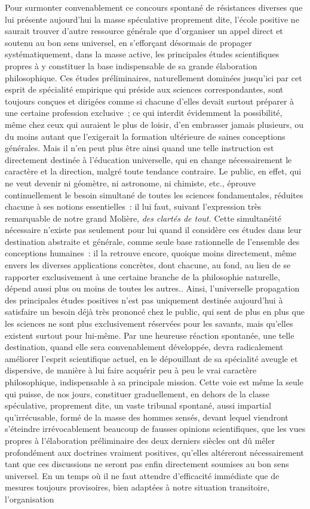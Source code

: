 \documentclass[french,twoside]{book} %
\begin{document}
Pour surmonter convenablement ce concours spontané de résistances diverses que lui présente aujourd’hui la masse spéculative proprement dite, l’école positive ne saurait trouver d’autre ressource générale que d’organiser un appel direct et soutenu au bon sens universel, en s’efforçant désormais de propager systématiquement, dans la masse active, les principales études scientifiques propres à y constituer la base indispensable de sa grande élaboration philosophique. Ces études préliminaires, naturellement dominées jusqu’ici par cet esprit de spécialité empirique qui préside aux sciences correspondantes, sont toujours conçues et dirigées comme si chacune d’elles devait surtout préparer à une certaine profession exclusive ; ce qui interdit évidemment la possibilité, même chez ceux qui auraient le plus de loisir, d’en embrasser jamais plusieurs, ou du moins autant que l’exigerait la formation ultérieure de saines conceptions générales. Mais il n’en peut plus être ainsi quand une telle instruction est directement destinée à l’éducation universelle, qui en change nécessairement le caractère et la direction, malgré toute tendance contraire. Le public, en effet, qui ne veut devenir ni géomètre, ni astronome, ni chimiste, etc., éprouve continuellement le besoin simultané de toutes les sciences fondamentales, réduites chacune à ses notions essentielles : il lui faut, suivant l’expression très remarquable de notre grand Molière, {\itshape des clartés de tout.} Cette simultanéité nécessaire n’existe pas seulement pour lui quand il considère ces études dans leur destination abstraite et générale, comme seule base rationnelle de l’ensemble des conceptions humaines : il la retrouve encore, quoique moins directement, même envers les diverses applications concrètes, dont chacune, au fond, au lieu de se rapporter exclusivement à une certaine branche de la philosophie naturelle, dépend aussi plus ou moins de toutes les autres.. Ainsi, l’universelle propagation des principales études positives n’est pas uniquement destinée aujourd’hui à satisfaire un besoin déjà très prononcé chez le public, qui sent de plus en plus que les sciences ne sont plus exclusivement réservées pour les savants, mais qu’elles existent surtout pour lui-même. Par une heureuse réaction spontanée, une telle destination, quand elle sera convenablement développée, devra radicalement améliorer l’esprit scientifique actuel, en le dépouillant de sa spécialité aveugle et dispersive, de manière à lui faire acquérir peu à peu le vrai caractère philosophique, indispensable à sa principale mission. Cette voie est même la seule qui puisse, de nos jours, constituer graduellement, en dehors de la classe spéculative, proprement dite, un vaste tribunal spontané, aussi impartial qu’irrécusable, formé de la masse des hommes sensés, devant lequel viendront s’éteindre irrévocablement beaucoup de fausses opinions scientifiques, que les vues propres à l’élaboration préliminaire des deux derniers siècles ont dû mêler profondément aux doctrines vraiment positives, qu’elles altéreront nécessairement tant que ces discussions ne seront pas enfin directement soumises au bon sens universel. En un temps où il ne faut attendre d’efficacité immédiate que de mesures toujours provisoires, bien adaptées à notre situation transitoire, l’organisation 
\end{document}
